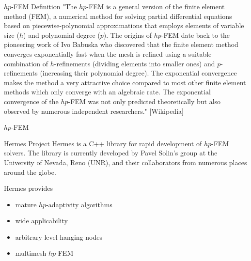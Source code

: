 \begin{frame}{$hp$-FEM}
  {Definition}
  \tiny
  "The \alert{$hp$-FEM} is a general version of the finite element method (FEM), a numerical method for solving partial differential equations based on piecewise-polynomial approximations that employs elements of variable size ($h$) and polynomial degree ($p$).  The origins of $hp$-FEM date back to the pioneering work of Ivo Babuska who discovered that the finite element method \alert{converges exponentially fast when the mesh is refined using a suitable combination of $h$-refinements} (dividing elements into smaller ones) \alert{and $p$-refinements} (increasing their polynomial degree).  The exponential convergence makes the method a very attractive choice compared to most other finite element methods which only converge with an algebraic rate.  The exponential convergence of the $hp$-FEM was not only predicted theoretically but also observed by numerous independent researchers." [Wikipedia]

\end{frame}

\begin{frame}{$hp$-FEM}
  \footnotesize
  
  \begin{block}{Hermes Project}
Hermes is a C++ library for rapid development of $hp$-FEM solvers.  The library is currently developed by Pavel Solin's group at the University of Nevada, Reno (UNR), and their collaborators from numerous places around the globe.
  \end{block}
\vspace{.3cm}

Hermes provides
\begin{itemize}
\item mature $hp$-adaptivity algorithms
\item wide applicability
\item arbitrary level hanging nodes
\item multimesh $hp$-FEM
\end{itemize}

\end{frame}


